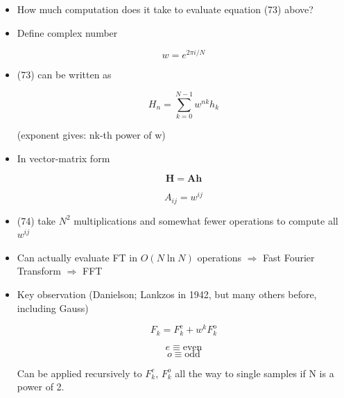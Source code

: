 \begin{itemize}
    \item How much computation does it take to evaluate equation (73) above?

    \item Define complex number

    \[ w = e^{2\pi i/N}\]

    \item (73) can be written as

    \[ H_n = \sum_{k=0}^{N-1} w^{nk} h_k \]

    (exponent gives: nk-th power of w)
    
    \item In vector-matrix form

    \begin{equation}
        \mathbf{H} = \mathbf{A} \mathbf{h}
    \end{equation}

    \[ A_{ij} = w^{ij}\]

    \item (74) take $N^2$ multiplications and somewhat fewer operations to compute all $w^{ij}$

    \item Can actually evaluate FT in $O(N \ln N)$ operations $\Rightarrow$ Fast Fourier Transform $\Rightarrow$ FFT

    \item Key observation (Danielson; Lankzos in 1942, but many others before, including Gauss) 

    \[ F_k = F_k^{\text{e}} + w^k F_k^{\text{o}}\]

    \[ e \equiv \text{even}\]
    \[ o \equiv \text{odd}\]

    Can be applied recursively to $F_k^e$, $F_k^o$ all the way to single samples if N is a power of 2.

\end{itemize}
